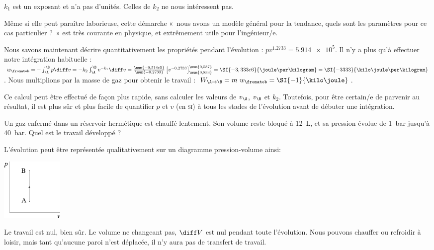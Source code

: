 \begin{anexample}
\begin{answer}
							\begin{remark}$k_1$ est un exposant et n’a pas d’unités. Celles de $k_2$ ne nous intéressent pas.\end{remark}
							\begin{remark}Même si elle peut paraître laborieuse, cette démarche «~nous avons un modèle général pour la tendance, quels sont les paramètres pour ce cas particulier ?~» est très courante en physique, et extrêmement utile pour l’ingénieur/e.\end{remark}
						Nous savons maintenant décrire quantitativement les propriétés pendant l’évolution : $p v^{\num{1,2733}} = \num{5,914e5}$.	Il n’y a plus qu’à effectuer notre intégration habituelle : $w_\fromatob = - \int_\A^\B p \diff v = - k_2 \int_\A^\B v^{-k_1} \diff v = \frac{\num{-9,514e5}}{\num{-0,2733}} \left[v^{-0,2733}\right]_{\num{0,833}}^{\num{0,587}} = \SI{-3,333e6}{\joule\per\kilogram} = \SI{-3333}{\kilo\joule\per\kilogram}$. Nous multiplions par la masse de gaz pour obtenir le travail : $W_{\A\to\B} = m \ w_\fromatob = \SI{-1}{\kilo\joule}$. 
							\begin{remark}Ce calcul peut être effectué de façon plus rapide, sans calculer les valeurs de $v_\A$, $v_\B $ et $k_2$. Toutefois, pour être certain/e de parvenir au résultat, il est plus sûr et plus facile de quantifier $p$ et $v$ (en \textsc{si}) à tous les stades de l’évolution avant de débuter une intégration.\end{remark}
					\end{answer}
			\end{anexample}
			
			\begin{anexample}
				Un gaz enfermé dans un réservoir hermétique est chauffé lentement. Son volume reste bloqué à \SI{12}{\liter}, et sa pression évolue de \SI{1}{\bar} jusqu’à \SI{40}{\bar}. Quel est le travail développé ?
					\begin{answer}
						L’évolution peut être représentée qualitativement sur un diagramme pression-volume ainsi:
							\begin{center}
								\includegraphics[width=3cm]{images/ex_pv_isochore.png}
							\end{center}
						Le travail est nul, bien sûr. Le volume ne changeant pas, $\diff V$ est nul pendant toute l’évolution. Nous pouvons chauffer ou refroidir à loisir, mais tant qu’aucune paroi n’est déplacée, il n’y aura pas de transfert de travail.
					\end{answer}
			\end{anexample}
			

